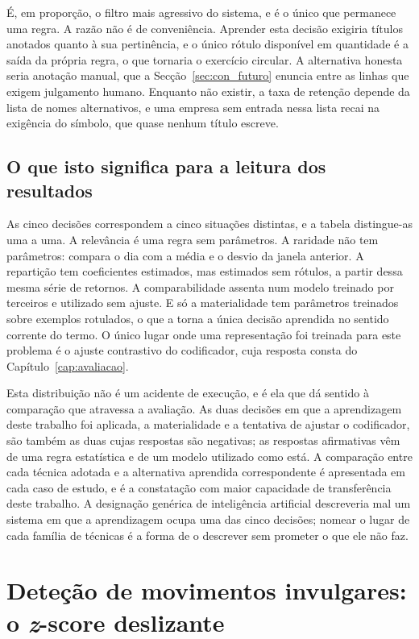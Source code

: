 É, em proporção, o filtro mais agressivo do sistema, e é o único que permanece uma regra. A
razão não é de conveniência. Aprender esta decisão exigiria títulos anotados quanto à sua
pertinência, e o único rótulo disponível em quantidade é a saída da própria regra, o que
tornaria o exercício circular. A alternativa honesta seria anotação manual, que a
Secção~\ref{sec:con_futuro} enuncia entre as linhas que exigem julgamento humano. Enquanto não
existir, a taxa de retenção depende da lista de nomes alternativos, e uma empresa sem entrada
nessa lista recai na exigência do símbolo, que quase nenhum título escreve.

\subsection*{O que isto significa para a leitura dos resultados}

As cinco decisões correspondem a cinco situações distintas, e a tabela distingue-as uma a
uma. A relevância é uma regra sem parâmetros. A raridade não tem parâmetros: compara o dia com a
média e o desvio da janela anterior. A repartição tem coeficientes estimados, mas estimados sem
rótulos, a partir dessa mesma série de retornos. A comparabilidade assenta num modelo treinado
por terceiros e utilizado sem ajuste. E só a materialidade tem parâmetros treinados sobre
exemplos rotulados, o que a torna a única decisão aprendida no sentido corrente do termo. O único lugar onde uma
representação foi treinada para este problema é o ajuste contrastivo do codificador, cuja
resposta consta do Capítulo~\ref{cap:avaliacao}.

Esta distribuição não é um acidente de execução, e é ela que dá sentido à comparação que
atravessa a avaliação. As duas decisões em que a aprendizagem deste trabalho foi aplicada, a
materialidade e a tentativa de ajustar o codificador, são também as duas cujas respostas são
negativas; as respostas afirmativas vêm de uma regra estatística e de um modelo utilizado como
está. A comparação entre cada técnica adotada e a alternativa aprendida correspondente é
apresentada em cada caso de estudo, e é a constatação com maior capacidade de transferência
deste trabalho. A designação
genérica de inteligência artificial descreveria mal um sistema em que a aprendizagem ocupa uma
das cinco decisões; nomear o lugar de cada família de técnicas é a forma de o descrever sem
prometer o que ele não faz.

\section{Deteção de movimentos invulgares: o \emph{z}-score deslizante}
\label{sec:met_detecao}

